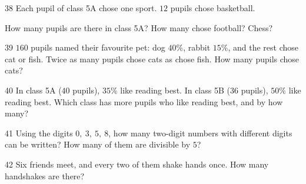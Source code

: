 \gap
\needspace{7.5cm}
\begin{probbox}{38}{}
Each pupil of class 5A chose one sport. $12$ pupils chose basketball.
\begin{center}
\end{center}
 How many pupils are there in class 5A? \quad {} How many chose football? Chess?
\end{probbox}
\gap
\begin{probbox}{39}{}
$160$ pupils named their favourite pet: dog $40\%$, rabbit $15\%$, and the rest chose cat or fish. Twice as many pupils chose cats as chose fish. How many pupils chose cats?
\end{probbox}
\gap
\begin{probbox}{40}{}
In class 5A ($40$ pupils), $35\%$ like reading best. In class 5B ($36$ pupils), $50\%$ like reading best. Which class has more pupils who like reading best, and by how many?
\end{probbox}
\gap
\begin{probbox}{41}{}
Using the digits $0,\ 3,\ 5,\ 8$, how many two-digit numbers with different digits can be written? How many of them are divisible by $5$?
\end{probbox}
\gap
\begin{probbox}{42}{}
Six friends meet, and every two of them shake hands once. How many handshakes are there?
\end{probbox}
